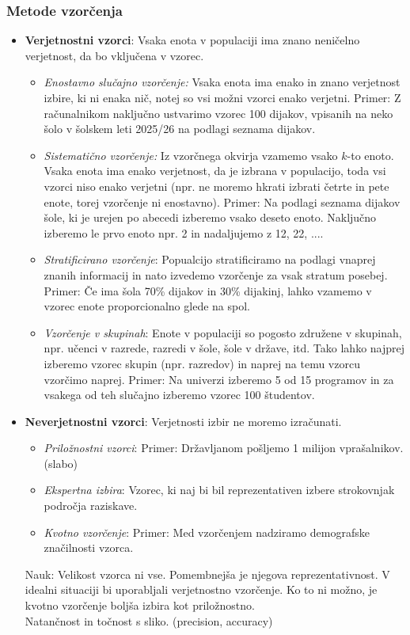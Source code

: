 \subsubsection*{Metode vzorčenja}
\begin{itemize}
    \item \textbf{Verjetnostni vzorci}: Vsaka enota v populaciji ima znano neničelno verjetnost, da bo vključena v vzorec.
    \begin{itemize}
        \item \textit{Enostavno slučajno vzorčenje:} Vsaka enota ima enako in znano verjetnost izbire, ki ni enaka nič, notej so vsi možni vzorci enako verjetni. Primer: Z računalnikom naključno ustvarimo vzorec 100 dijakov, vpisanih na neko šolo v šolskem leti 2025/26 na podlagi seznama dijakov.
        \item \textit{Sistematično vzorčenje:} Iz vzorčnega okvirja vzamemo vsako $k$-to enoto. Vsaka enota ima enako verjetnost, da je izbrana v populacijo, toda vsi vzorci niso enako verjetni (npr. ne moremo hkrati izbrati četrte in pete enote, torej vzorčenje ni enostavno). Primer: Na podlagi seznama dijakov šole, ki je urejen po abecedi izberemo vsako deseto enoto. Naključno izberemo le prvo enoto npr. 2 in nadaljujemo z 12, 22, ....
        \item \textit{Stratificirano vzorčenje}: Popualcijo stratificiramo na podlagi vnaprej znanih informacij in nato izvedemo vzorčenje za vsak stratum posebej. Primer: Če ima šola 70\% dijakov in 30\% dijakinj, lahko vzamemo v vzorec enote proporcionalno glede na spol.
        \item \textit{Vzorčenje v skupinah}: Enote v populaciji so pogosto združene v skupinah, npr. učenci v razrede, razredi v šole, šole v države, itd. Tako lahko najprej izberemo vzorec skupin (npr. razredov) in naprej na temu vzorcu vzorčimo naprej. Primer: Na univerzi izberemo 5 od 15 programov in za vsakega od teh slučajno izberemo vzorec 100 študentov.
    \end{itemize}
    \item \textbf{Neverjetnostni vzorci}: Verjetnosti izbir ne moremo izračunati.
    \begin{itemize}
        \item \textit{Priložnostni vzorci}: Primer: Državljanom pošljemo 1 milijon vprašalnikov. (slabo)
        \item \textit{Ekspertna izbira}: Vzorec, ki naj bi bil reprezentativen izbere strokovnjak področja raziskave.
        \item \textit{Kvotno vzorčenje}: Primer: Med vzorčenjem nadziramo demografske značilnosti vzorca.
    \end{itemize}
    Nauk: Velikost vzorca ni vse. Pomembnejša je njegova reprezentativnost. V idealni situaciji bi uporabljali verjetnostno vzorčenje. Ko to ni možno, je kvotno vzorčenje boljša izbira kot priložnostno.\\
    Natančnost in točnost s sliko. (precision, accuracy)
\end{itemize}

